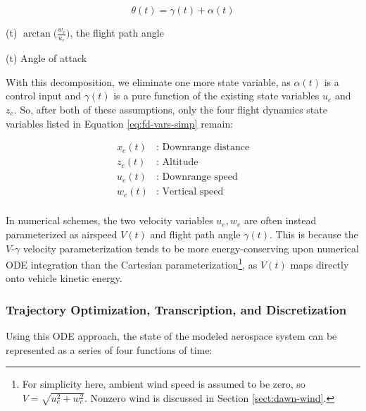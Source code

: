 \begin{equation}
    \theta(t) = \gamma(t) + \alpha(t)
    \label{eq:pitch-split}
\end{equation}

\begin{eqexpl}
    \item{\gamma(t)} $\arctan\big(\frac{w_e}{u_e}\big)$, the flight path angle
    \item{\alpha(t)} Angle of attack
\end{eqexpl}

With this decomposition, we eliminate one more state variable, as $\alpha(t)$ is a control input and $\gamma(t)$ is a pure function of the existing state variables $u_e$ and $z_e$. So, after both of these assumptions, only the four flight dynamics state variables listed in Equation \ref{eq:fd-vars-simp} remain:

\begin{equation}
    \begin{aligned}
        x_e(t)&\text{: Downrange distance}\\
        z_e(t)&\text{: Altitude}\\
        u_e(t)&\text{: Downrange speed}\\
        w_e(t)&\text{: Vertical speed}\\
    \end{aligned}
    \label{eq:fd-vars-simp}
\end{equation}

In numerical schemes, the two velocity variables $u_e, w_e$ are often instead parameterized as airspeed $V(t)$ and flight path angle $\gamma(t)$. This is because the $V$-$\gamma$ velocity parameterization tends to be more energy-conserving upon numerical ODE integration than the Cartesian parameterization\footnote{For simplicity here, ambient wind speed is assumed to be zero, so $V = \sqrt{u_e^2 + w_e^2}$. Nonzero wind is discussed in Section \ref{sect:dawn-wind}.}, as $V(t)$ maps directly onto vehicle kinetic energy. %

\subsubsection{Trajectory Optimization, Transcription, and Discretization}
\label{sect:dynamics-parameterization}

Using this ODE approach, the state of the modeled aerospace system can be represented as a series of four functions of time:

